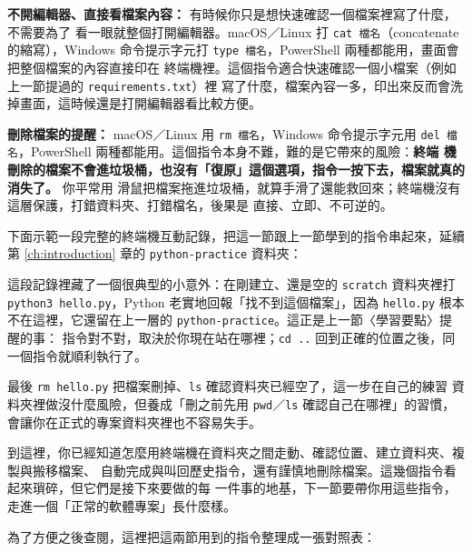 \textbf{不開編輯器、直接看檔案內容：} 有時候你只是想快速確認一個檔案裡寫了什麼，不需要為了
看一眼就整個打開編輯器。macOS／Linux 打 \texttt{cat 檔名}（concatenate 的縮寫），Windows
命令提示字元打 \texttt{type 檔名}，PowerShell 兩種都能用，畫面會把整個檔案的內容直接印在
終端機裡。這個指令適合快速確認一個小檔案（例如上一節提過的 \texttt{requirements.txt}）裡
寫了什麼，檔案內容一多，印出來反而會洗掉畫面，這時候還是打開編輯器看比較方便。

\textbf{刪除檔案的提醒：} macOS／Linux 用 \texttt{rm 檔名}，Windows 命令提示字元用
\texttt{del 檔名}，PowerShell 兩種都能用。這個指令本身不難，難的是它帶來的風險：\textbf{終端
機刪除的檔案不會進垃圾桶，也沒有「復原」這個選項，指令一按下去，檔案就真的消失了。} 你平常用
滑鼠把檔案拖進垃圾桶，就算手滑了還能救回來；終端機沒有這層保護，打錯資料夾、打錯檔名，後果是
直接、立即、不可逆的。

下面示範一段完整的終端機互動記錄，把這一節跟上一節學到的指令串起來，延續第 \ref{ch:introduction} 章的
\texttt{python-practice} 資料夾：


這段記錄裡藏了一個很典型的小意外：在剛建立、還是空的 \texttt{scratch} 資料夾裡打
\texttt{python3 hello.py}，Python 老實地回報「找不到這個檔案」，因為 \texttt{hello.py}
根本不在這裡，它還留在上一層的 \texttt{python-practice}。這正是上一節〈學習要點〉提醒的事：
指令對不對，取決於你現在站在哪裡；\texttt{cd ..} 回到正確的位置之後，同一個指令就順利執行了。

最後 \texttt{rm hello.py} 把檔案刪掉、\texttt{ls} 確認資料夾已經空了，這一步在自己的練習
資料夾裡做沒什麼風險，但養成「刪之前先用 \texttt{pwd}／\texttt{ls} 確認自己在哪裡」的習慣，
會讓你在正式的專案資料夾裡也不容易失手。

到這裡，你已經知道怎麼用終端機在資料夾之間走動、確認位置、建立資料夾、複製與搬移檔案、
自動完成與叫回歷史指令，還有謹慎地刪除檔案。這幾個指令看起來瑣碎，但它們是接下來要做的每
一件事的地基，下一節要帶你用這些指令，走進一個「正常的軟體專案」長什麼樣。

為了方便之後查閱，這裡把這兩節用到的指令整理成一張對照表：

